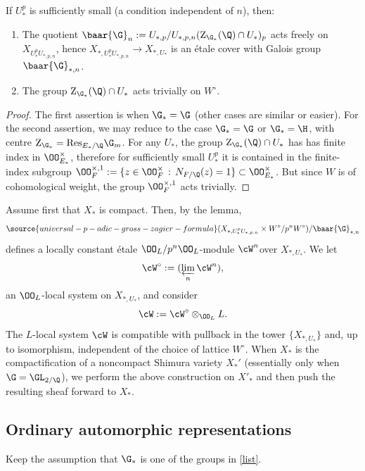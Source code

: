 \begin{lemm}\label{free action} If $U^p_*$ is sufficiently small (a condition independent of $n$), then:
\begin{enumerate}
\item The quotient $\baar{\G}_n:=U_{*,p}/U_{*,p, n}({\rm Z}_{\G_*}(\Q) \cap U_*)_p$ acts freely on $X_{U_*^pU_{*,p,n}}$, hence $X_{*,U_*^pU_{*,p,n}}\to X_{*, U_*}$ is an \'etale  cover with Galois group $\baar{\G}_{*,n}$.
\item The group ${\rm Z}_{\G_*}(\Q) \cap U_*$ acts trivially on $W^{\circ}$.
\end{enumerate}
\end{lemm}
\begin{proof} The first assertion is \cite[Lemme 1.4.1.1]{carayol}  when $\G_*=\G$ (other cases are similar or easier).
For the second assertion, we may reduce to the case $\G_*=\G $ or $\G_*=\H$, with centre ${\rm Z}_{\G_*}={\rm Res}_{E_*/\Q}\G_m$. For any $U_*$, the group ${\rm Z}_{\G_*}(\Q) \cap U_*$ has has finite index in $\OO_{E_*}^\times$, therefore  for sufficiently small $U_*^p$
it  is contained in the finite-index subgroup $\OO_{F}^{\times, 1}:=\{z\in \OO_F^\times \, :\, N_{F/\Q}(z)=1\}\subset \OO_{E_*}^\times$. But since $W$ is of cohomological weight, the group $\OO_{F}^{\times, 1}$ acts trivially.
\end{proof}


 Assume first that $X_{*}$ is compact.
  Then, by the lemma,
 \begin{align}\label{Upn}
\source{universal-p-adic-gross-zagier-formula}
 (X_{*,U_{*}^{p}U_{*,p, n}}\times W^{\circ}/p^{n}W^{\circ})/\baar{\G}_{*,n}
 \end{align}
 defines a locally constant \'etale $\OO_{L}/p^{n}\OO_{L}$-module  $\cW^{n}$over $X_{*,U_{*}}$. We let
 $$ \cW^{\circ}:=  (\varprojlim_{n} \cW^{ n}),$$
   an $\OO_{L}$-local system on $X_{*, U_{*}}$, and consider
   $$\cW:=\cW^{\circ}\otimes_{\OO_{L}}L.$$ The $L$-local system $\cW$  is compatible with pullback in the tower $\{X_{*, U_{*}}\}$ and, up to isomorphism, independent of the choice of lattice $W^{\circ}$.  When $X_{*}$ is the compactification of a noncompact Shimura variety $X_{*}'$ (essentially only when $\G=\GL_{2/\Q}$), we perform the above construction on  $X'_{*}$ and then push the resulting sheaf forward to $X_{*}$.


\subsection{Ordinary automorphic representations}  Keep the assumption that $\G_{*}$ is one of the groups in \eqref{list}.
